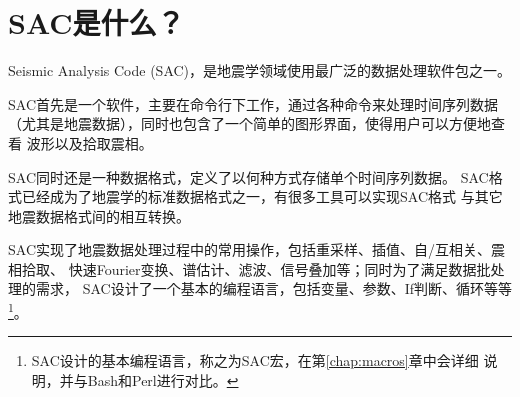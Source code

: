 \section{SAC是什么？}

Seismic Analysis Code (SAC)，是地震学领域使用最广泛的数据处理软件包之一。

SAC首先是一个软件，主要在命令行下工作，通过各种命令来处理时间序列数据
（尤其是地震数据），同时也包含了一个简单的图形界面，使得用户可以方便地查看
波形以及拾取震相。

SAC同时还是一种数据格式，定义了以何种方式存储单个时间序列数据。
SAC格式已经成为了地震学的标准数据格式之一，有很多工具可以实现SAC格式
与其它地震数据格式间的相互转换。

SAC实现了地震数据处理过程中的常用操作，包括重采样、插值、自/互相关、震相拾取、
快速Fourier变换、谱估计、滤波、信号叠加等；同时为了满足数据批处理的需求，
SAC设计了一个基本的编程语言，包括变量、参数、If判断、循环等等
\footnote{SAC设计的基本编程语言，称之为SAC宏，在第\ref{chap:macros}章中会详细
说明，并与Bash和Perl进行对比。}。
